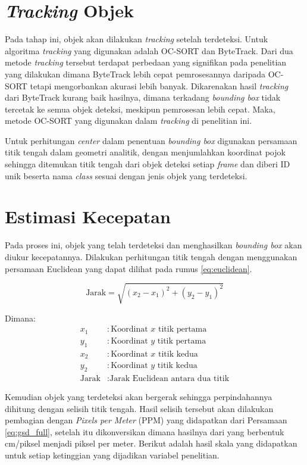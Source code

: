 \section{\emph{Tracking} Objek}
Pada tahap ini, objek akan dilakukan \emph{tracking} setelah terdeteksi. Untuk algoritma \emph{tracking} yang digunakan adalah OC-SORT dan ByteTrack. Dari dua metode \emph{tracking} tersebut terdapat perbedaan yang signifikan pada penelitian yang dilakukan dimana ByteTrack lebih cepat pemrosesannya daripada OC-SORT tetapi mengorbankan akurasi lebih banyak. Dikarenakan hasil \emph{tracking} dari ByteTrack kurang baik hasilnya, dimana terkadang \emph{bounding box} tidak tercetak ke semua objek deteksi, meskipun pemrosesan lebih cepat. Maka, metode OC-SORT yang digunakan dalam \emph{tracking} di penelitian ini.

Untuk perhitungan \emph{center} dalam penentuan \emph{bounding box} digunakan persamaan titik tengah dalam geometri analitik, dengan menjumlahkan koordinat pojok sehingga ditemukan titik tengah dari objek deteksi setiap \emph{frame} dan diberi ID unik beserta nama \emph{class} sesuai dengan jenis objek yang terdeteksi.

\section{Estimasi Kecepatan}
Pada proses ini, objek yang telah terdeteksi dan menghasilkan \emph{bounding box} akan diukur kecepatannya. Dilakukan perhitungan titik tengah dengan menggunakan persamaan Euclidean yang dapat dilihat pada rumus \ref{eq:euclidean}.

\begin{equation}
  \label{eq:euclidean}
  \text{Jarak} = \sqrt{(x_2 - x_1)^2 + (y_2 - y_1)^2}
\end{equation}

\begin{flushleft}
Dimana:
\begin{align*}
x_1 & : \text{Koordinat $x$ titik pertama} \\
y_1 & : \text{Koordinat $y$ titik pertama} \\
x_2 & : \text{Koordinat $x$ titik kedua} \\
y_2 & : \text{Koordinat $y$ titik kedua} \\
\text{Jarak} & : \text{Jarak Euclidean antara dua titik}
\end{align*}
\end{flushleft}

Kemudian objek yang terdeteksi akan bergerak sehingga perpindahannya dihitung dengan selisih titik tengah. Hasil selisih tersebut akan dilakukan pembagian dengan \emph{Pixels per Meter} (PPM) yang didapatkan dari Persamaan \ref{eq:gsd_full}, setelah itu dikonversikan dimana hasilnya dari yang berbentuk cm/piksel menjadi piksel per meter. Berikut adalah hasil skala yang didapatkan untuk setiap ketinggian yang dijadikan variabel penelitian. 

